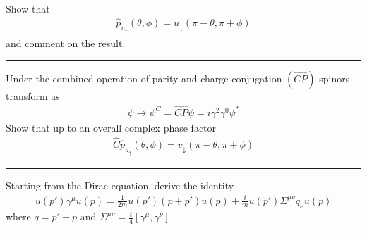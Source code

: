 \begin{problem}{4.13}
Show that
\begin{align*}
    \hat{p}_{u_\uparrow} \left( \theta,\phi \right) = u_\downarrow \left( \pi-\theta,\pi+\phi \right)
\end{align*}
and comment on the result.
\end{problem}
\begin{solution}

\end{solution}

\noindent\rule{7in}{1.5pt}


\begin{problem}{4.14}
Under the combined operation of parity and charge conjugation $(\hat{C}\hat{P})$ spinors transform as
\begin{align*}
    \psi \to \psi^C = \hat{C}\hat{P} \psi = i \gamma^2\gamma^0 \psi^\ast 
\end{align*}
Show that up to an overall complex phase factor
\begin{align*}
    \hat{C}\hat{p}_{u_\uparrow} \left( \theta,\phi \right) = v_\downarrow  \left( \pi-\theta,\pi+\phi \right)
\end{align*}
\end{problem}
\begin{solution}

\end{solution}

\noindent\rule{7in}{1.5pt}


\begin{problem}{4.15}
Starting from the Dirac equation, derive the identity
\begin{align*}
    \overbar{u}  (p') \gamma^\mu u ( p ) = \frac{1}{2m} \overbar{u}(p') \left(p+p'\right) u(p) + \frac{i}{m} \overbar{u}\left(p'\right) \Sigma^{\mu\nu} q_\nu u(p)
\end{align*}
where $q = p'-p$ and $\Sigma^{\mu\nu}=\frac{i}{4}\left[ \gamma^\mu,\gamma^\nu \right]$
\end{problem}
\begin{solution}

\end{solution}

\noindent\rule{7in}{1.5pt}


